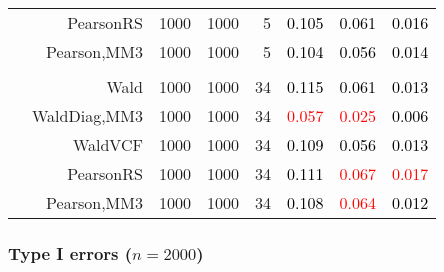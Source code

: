 \documentclass[
]{article}
\begin{document}
\begin{table}[H]
{\begin{tabular}[t]{lrrrrrrr}
\hspace{1em} & PearsonRS & 1000 & 1000 & 5 & \textcolor{black}{0.105} & \textcolor{black}{0.061} & \textcolor{black}{0.016}\\

\hspace{1em} & Pearson,MM3 & 1000 & 1000 & 5 & \textcolor{black}{0.104} & \textcolor{black}{0.056} & \textcolor{black}{0.014}\\
\cmidrule{1-8}
\addlinespace[0.3em]
\multicolumn{8}{l}{\textbf{3F 15V}}\\
\hspace{1em} & Wald & 1000 & 1000 & 34 & \textcolor{black}{0.115} & \textcolor{black}{0.061} & \textcolor{black}{0.013}\\

\hspace{1em} & WaldDiag,MM3 & 1000 & 1000 & 34 & \textcolor{red}{0.057} & \textcolor{red}{0.025} & \textcolor{black}{0.006}\\

\hspace{1em} & WaldVCF & 1000 & 1000 & 34 & \textcolor{black}{0.109} & \textcolor{black}{0.056} & \textcolor{black}{0.013}\\

\hspace{1em} & PearsonRS & 1000 & 1000 & 34 & \textcolor{black}{0.111} & \textcolor{red}{0.067} & \textcolor{red}{0.017}\\

\hspace{1em} & Pearson,MM3 & 1000 & 1000 & 34 & \textcolor{black}{0.108} & \textcolor{red}{0.064} & \textcolor{black}{0.012}\\
\bottomrule
\end{tabular}}
\endgroup{}
\end{table}

\hypertarget{type-i-errors-n2000}{%
\subsubsection{\texorpdfstring{Type I errors
(\(n=2000\))}{Type I errors (n=2000)}}\label{type-i-errors-n2000}}
\end{document}
